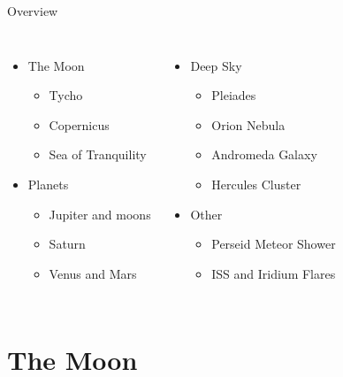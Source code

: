 \documentclass[pdf, ]{beamer}
\begin{document}
\begin{frame}{Overview}
	\begin{columns}
		\begin{itemize}
			\item The Moon
				\begin{itemize}
					\item Tycho
					\item Copernicus
					\item Sea of Tranquility
				\end{itemize}
			\item Planets
				\begin{itemize}
					\item Jupiter and moons
					\item Saturn
					\item Venus and Mars
				\end{itemize}
		\end{itemize}
		
		\begin{itemize}
		\item Deep Sky
			\begin{itemize}
				\item Pleiades
				\item Orion Nebula
				\item Andromeda Galaxy
				\item Hercules Cluster
			\end{itemize}
		\item Other
			\begin{itemize}
				\item Perseid Meteor Shower
				\item ISS and Iridium Flares
			\end{itemize}
		\end{itemize}
	\end{columns}
\end{frame}



\section{The Moon}
\end{document}
